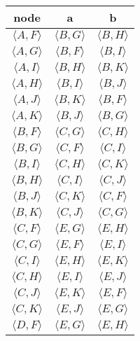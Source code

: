 \documentclass[a4paper, 12pt]{article}
\begin{document}
\begin{center}
\begin{tabular}{||c | c | c ||}
    \hline
  \rowcolor[gray]{.9} node & a & b \\  \hline \hline
  $ \langle A, F \rangle $ & $ \langle B, G \rangle $ & $ \langle B, H \rangle $ \\ \hline
  $ \langle A, G \rangle $ & $ \langle B, F \rangle $ & $ \langle B, I \rangle $ \\ \hline
  $ \langle A, I \rangle $ & $ \langle B, H \rangle $ & $ \langle B, K \rangle $ \\ \hline
  $ \langle A, H \rangle $ & $ \langle B, I \rangle $ & $ \langle B, J \rangle $  \\ \hline
  $ \langle A, J \rangle $ & $ \langle B, K \rangle $ & $ \langle B, F \rangle $ \\ \hline
  $ \langle A, K \rangle $ & $ \langle B, J \rangle $ & $ \langle B, G \rangle $ \\ \hline
  $ \langle B, F \rangle $ & $ \langle C, G \rangle $ & $ \langle C, H \rangle $ \\ \hline
  $ \langle B, G \rangle $ & $ \langle C, F \rangle $ & $ \langle C, I \rangle $ \\ \hline
  $ \langle B, I \rangle $ & $ \langle C, H \rangle $ & $ \langle C, K \rangle $ \\ \hline
  $ \langle B, H \rangle $ & $ \langle C, I \rangle $ & $ \langle C, J \rangle $  \\ \hline
  $ \langle B, J \rangle $ & $ \langle C, K \rangle $ & $ \langle C, F \rangle $ \\ \hline
  $ \langle B, K \rangle $ & $ \langle C, J \rangle $ & $ \langle C, G \rangle $ \\ \hline
  $ \langle C, F \rangle $ & $ \langle E, G \rangle $ & $ \langle E, H \rangle $ \\ \hline
  $ \langle C, G \rangle $ & $ \langle E, F \rangle $ & $ \langle E, I \rangle $ \\ \hline
  $ \langle C, I \rangle $ & $ \langle E, H \rangle $ & $ \langle E, K \rangle $ \\ \hline
  $ \langle C, H \rangle $ & $ \langle E, I \rangle $ & $ \langle E, J \rangle $  \\ \hline
  $ \langle C, J \rangle $ & $ \langle E, K \rangle $ & $ \langle E, F \rangle $ \\ \hline
  $ \langle C, K \rangle $ & $ \langle E, J \rangle $ & $ \langle E, G \rangle $ \\ \hline
  $ \langle D, F \rangle $ & $ \langle E, G \rangle $ & $ \langle E, H \rangle $ \\ \hline

\end{tabular}
\end{center}
\end{document}
